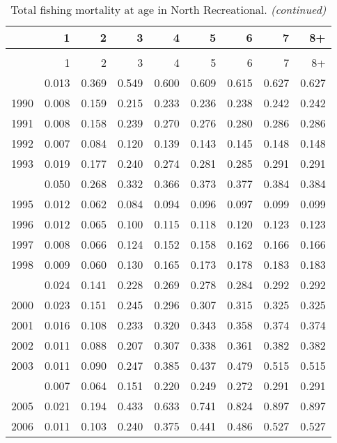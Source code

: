 \documentclass[
]{article}
\begin{document}
\begin{longtable}[t]{lrrrrrrrr}
\caption{\label{tab:North_Recreational-fleet-FAA-table}Total fishing mortality at age in North Recreational.}\\
\toprule
  & 1 & 2 & 3 & 4 & 5 & 6 & 7 & 8+\\
\midrule
\endfirsthead
\caption[]{Total fishing mortality at age in North Recreational. \textit{(continued)}}\\
\toprule
  & 1 & 2 & 3 & 4 & 5 & 6 & 7 & 8+\\
\midrule
\endhead

\endfoot
\bottomrule
\endlastfoot
1989 & 0.013 & 0.369 & 0.549 & 0.600 & 0.609 & 0.615 & 0.627 & 0.627\\
1990 & 0.008 & 0.159 & 0.215 & 0.233 & 0.236 & 0.238 & 0.242 & 0.242\\
1991 & 0.008 & 0.158 & 0.239 & 0.270 & 0.276 & 0.280 & 0.286 & 0.286\\
1992 & 0.007 & 0.084 & 0.120 & 0.139 & 0.143 & 0.145 & 0.148 & 0.148\\
1993 & 0.019 & 0.177 & 0.240 & 0.274 & 0.281 & 0.285 & 0.291 & 0.291\\
\addlinespace
1994 & 0.050 & 0.268 & 0.332 & 0.366 & 0.373 & 0.377 & 0.384 & 0.384\\
1995 & 0.012 & 0.062 & 0.084 & 0.094 & 0.096 & 0.097 & 0.099 & 0.099\\
1996 & 0.012 & 0.065 & 0.100 & 0.115 & 0.118 & 0.120 & 0.123 & 0.123\\
1997 & 0.008 & 0.066 & 0.124 & 0.152 & 0.158 & 0.162 & 0.166 & 0.166\\
1998 & 0.009 & 0.060 & 0.130 & 0.165 & 0.173 & 0.178 & 0.183 & 0.183\\
\addlinespace
1999 & 0.024 & 0.141 & 0.228 & 0.269 & 0.278 & 0.284 & 0.292 & 0.292\\
2000 & 0.023 & 0.151 & 0.245 & 0.296 & 0.307 & 0.315 & 0.325 & 0.325\\
2001 & 0.016 & 0.108 & 0.233 & 0.320 & 0.343 & 0.358 & 0.374 & 0.374\\
2002 & 0.011 & 0.088 & 0.207 & 0.307 & 0.338 & 0.361 & 0.382 & 0.382\\
2003 & 0.011 & 0.090 & 0.247 & 0.385 & 0.437 & 0.479 & 0.515 & 0.515\\
\addlinespace
2004 & 0.007 & 0.064 & 0.151 & 0.220 & 0.249 & 0.272 & 0.291 & 0.291\\
2005 & 0.021 & 0.194 & 0.433 & 0.633 & 0.741 & 0.824 & 0.897 & 0.897\\
2006 & 0.011 & 0.103 & 0.240 & 0.375 & 0.441 & 0.486 & 0.527 & 0.527\\

\end{longtable}
\end{document}
